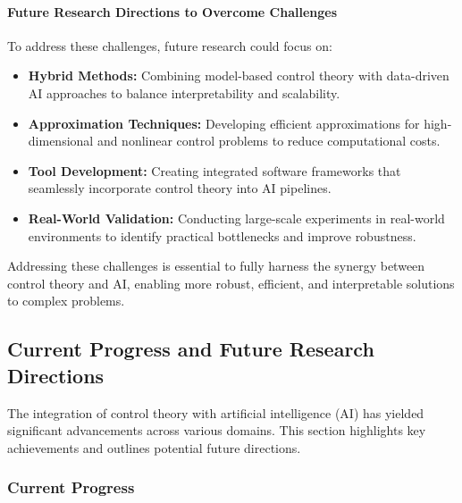 \documentclass{IEEEojcsys}
\begin{document}
\paragraph{Future Research Directions to Overcome Challenges}
To address these challenges, future research could focus on:
\begin{itemize}
    \item \textbf{Hybrid Methods:} Combining model-based control theory with data-driven AI approaches to balance interpretability and scalability.
    \item \textbf{Approximation Techniques:} Developing efficient approximations for high-dimensional and nonlinear control problems to reduce computational costs.
    \item \textbf{Tool Development:} Creating integrated software frameworks that seamlessly incorporate control theory into AI pipelines.
    \item \textbf{Real-World Validation:} Conducting large-scale experiments in real-world environments to identify practical bottlenecks and improve robustness.
\end{itemize}

Addressing these challenges is essential to fully harness the synergy between control theory and AI, enabling more robust, efficient, and interpretable solutions to complex problems.

\subsection{Current Progress and Future Research Directions}
The integration of control theory with artificial intelligence (AI) has yielded significant advancements across various domains. This section highlights key achievements and outlines potential future directions.

\subsubsection{Current Progress}
\end{document}
